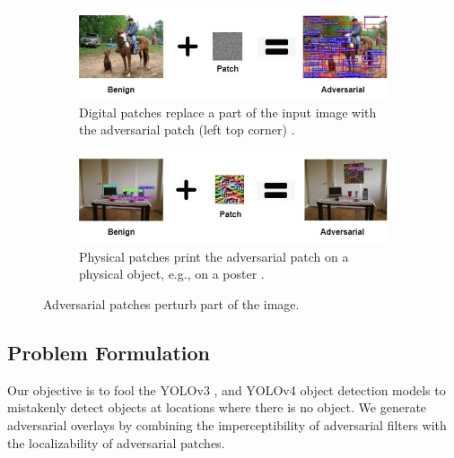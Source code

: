 \begin{figure}[H]
    \centering
    \begin{subfigure}[b]{\textwidth}
        \includegraphics[width=\textwidth]{figures/chapter_detection/detection/digital_patch.jpg}
        \caption{Digital patches replace a part of the input image with the adversarial patch (left top corner) \citep{liu2018dpatch}.}
        \label{fig:digital_patch}
    \end{subfigure}
    \begin{subfigure}[b]{\textwidth}
        \includegraphics[width=\textwidth]{figures/chapter_detection/detection/physical_patch.jpg}
        \caption{Physical patches print the adversarial patch on a physical object, e.g., on a poster \citep{lee2019physical}.}
        \label{fig:physical_patch}
    \end{subfigure}
    \caption{Adversarial patches perturb part of the image.}
    \label{fig:patch}
\end{figure}


\subsection{Problem Formulation} 

Our objective is to fool the YOLOv3 \citep{redmon2018yolov3}, and YOLOv4 \citep{bochkovskiy2020yolov4} object detection models to mistakenly detect objects at locations where there is no object. We generate adversarial overlays by combining the imperceptibility of adversarial filters with the localizability of adversarial patches.

